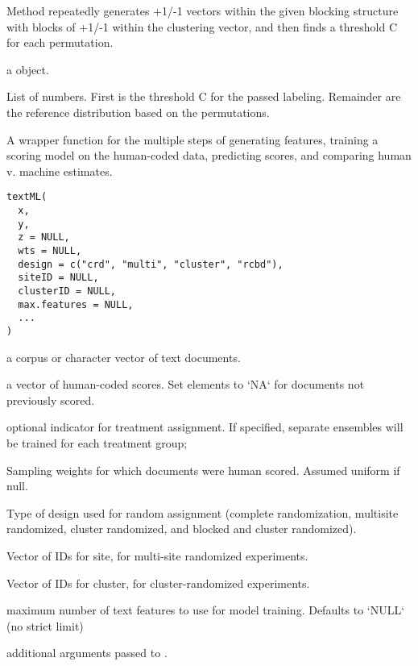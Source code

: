 \documentclass[a4paper]{book}
\begin{document}
%
\begin{Details}\relax
Method repeatedly generates +1/-1 vectors within the given blocking structure
with blocks of +1/-1 within the clustering vector, and then finds a threshold
C for each permutation.
\end{Details}
%
\begin{Value}
a  object.

List of numbers.  First is the threshold C for the passed labeling.
Remainder are the reference distribution based on the permutations.
\end{Value}
%
\begin{Description}\relax
A wrapper function for the multiple steps of generating features, training a
scoring model on the human-coded data, predicting scores, and comparing human
v. machine estimates.
\end{Description}
%
\begin{Usage}
\begin{verbatim}
textML(
  x,
  y,
  z = NULL,
  wts = NULL,
  design = c("crd", "multi", "cluster", "rcbd"),
  siteID = NULL,
  clusterID = NULL,
  max.features = NULL,
  ...
)
\end{verbatim}
\end{Usage}
%
\begin{Arguments}
\begin{ldescription}
\item[\code{x}] a corpus or character vector of text documents.

\item[\code{y}] a vector of human-coded scores. Set elements to `NA` for documents
not previously scored.

\item[\code{z}] optional indicator for treatment assignment. If specified, separate
ensembles will be trained for each treatment group;

\item[\code{wts}] Sampling weights for which documents were human scored.  Assumed uniform if null.

\item[\code{design}] Type of design used for random assignment (complete
randomization, multisite randomized, cluster randomized, and blocked and cluster randomized).

\item[\code{siteID}] Vector of IDs for site, for multi-site randomized experiments.

\item[\code{clusterID}] Vector of IDs for cluster, for cluster-randomized experiments.

\item[\code{max.features}] maximum number of text features to use for model
training. Defaults to `NULL` (no strict limit)

\item[\code{...}] additional arguments passed to .
\end{ldescription}
\end{Arguments}
\end{document}
